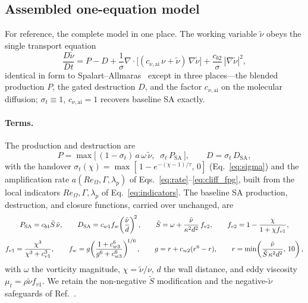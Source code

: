 \documentclass[journal]{new-aiaa}
\begin{document}
\subsection{Assembled one-equation model}\label{sec:assembled}

For reference, the complete model in one place. The working variable
$\tilde\nu$ obeys the single transport equation
\begin{equation}
  \frac{D\tilde\nu}{Dt} = P - D
  + \frac{1}{\sigma}\nabla\!\cdot\!\big[(c_{\nu,\mathrm{ai}}\,\nu+\tilde\nu)\,\nabla\tilde\nu\big]
  + \frac{c_{b2}}{\sigma}\,|\nabla\tilde\nu|^2,
  \label{eq:aisa}
\end{equation}
identical in form to Spalart--Allmaras~\cite{spalart_allmaras_1992} except in
three places---the blended production $P$, the gated destruction $D$, and the
factor $c_{\nu,\mathrm{ai}}$ on the molecular diffusion;
$\sigma_t\!\equiv\!1$, $c_{\nu,\mathrm{ai}}\!=\!1$ recovers baseline SA
exactly.

\paragraph{Terms.} The production and destruction are
\begin{equation}
  P = \max\!\big[\,(1-\sigma_t)\,a\,\omega\,\tilde\nu,\;\;\sigma_t\,P_\mathrm{SA}\,\big],
  \qquad
  D = \sigma_t\,D_\mathrm{SA},
  \label{eq:aisa_pd}
\end{equation}
with the handover $\sigma_t(\chi)\!=\!\max[\,1-e^{-(\chi-1)/\tau},\,0]$
(Eq.~\eqref{eq:sigma}) and the amplification rate $a(Re_\Omega,\Gamma,\lambda_p)$
of Eqs.~\eqref{eq:rate}--\eqref{eq:cliff_fpg}, built from the local indicators
$Re_\Omega,\Gamma,\lambda_p$ of Eq.~\eqref{eq:indicators}. The baseline SA
production, destruction, and closure functions, carried over unchanged, are
\begin{gather}
  P_\mathrm{SA} = c_{b1}\tilde S\,\tilde\nu, \qquad
  D_\mathrm{SA} = c_{w1}f_w\!\left(\frac{\tilde\nu}{d}\right)^{\!2}, \qquad
  \tilde S = \omega + \frac{\tilde\nu}{\kappa^2 d^2}\,f_{v2}, \qquad
  f_{v2} = 1 - \frac{\chi}{1+\chi f_{v1}}, \notag\\[3pt]
  f_{v1} = \frac{\chi^3}{\chi^3+c_{v1}^3}, \qquad
  f_w = g\!\left(\frac{1+c_{w3}^6}{g^6+c_{w3}^6}\right)^{\!1/6}, \qquad
  g = r + c_{w2}(r^6-r), \qquad
  r = \min\!\left(\frac{\tilde\nu}{\tilde S\,\kappa^2 d^2},\,10\right),
  \label{eq:sa_closure}
\end{gather}
with $\omega$ the vorticity magnitude, $\chi\!=\!\tilde\nu/\nu$, $d$ the wall
distance, and eddy viscosity $\mu_t\!=\!\rho\tilde\nu f_{v1}$. We retain the
non-negative $\tilde S$ modification and the negative-$\tilde\nu$ safeguards
of Ref.~\cite{allmaras_2012}.
\end{document}
